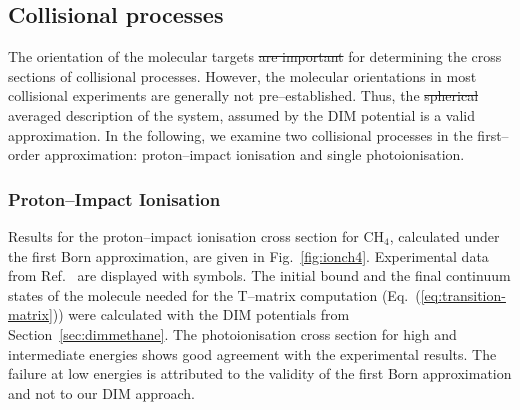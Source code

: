 \documentclass[10pt]{article}
\providecommand{\DIFaddtex}[1]{{\protect\color{blue}\uwave{#1}}} %
\providecommand{\DIFdeltex}[1]{{\protect\color{red}\sout{#1}}}                      %
\providecommand{\DIFaddbegin}{} %
\providecommand{\DIFaddend}{} %
\providecommand{\DIFdelbegin}{} %
\providecommand{\DIFdelend}{} %
\providecommand{\DIFadd}[1]{\texorpdfstring{\DIFaddtex{#1}}{#1}} %
\providecommand{\DIFdel}[1]{\texorpdfstring{\DIFdeltex{#1}}{}} %
\begin{document}
\subsection{Collisional processes}

The orientation of the molecular targets \DIFdelbegin \DIFdel{are important }\DIFdelend \DIFaddbegin \DIFadd{is crucial }\DIFaddend for determining
the cross sections of collisional processes. However, the molecular 
orientations in most collisional experiments are generally not 
pre--established. Thus, the \DIFdelbegin \DIFdel{spherical }\DIFdelend \DIFaddbegin \DIFadd{spherically }\DIFaddend averaged description of the system, 
assumed by the DIM potential is a valid approximation. In the 
following, we examine two collisional processes in the first--order 
approximation: proton--impact ionisation 
and single photoionisation. 

\subsubsection{Proton--Impact Ionisation}

Results for the proton--impact ionisation cross section for CH$_4$,
calculated under the first Born approximation, are given in 
Fig.~\ref{fig:ionch4}. 
Experimental data from Ref.~\cite{Rudd1983,Rudd1985} are displayed 
with symbols. The initial bound and the final continuum states 
of the molecule needed for the T--matrix computation 
(Eq.~(\ref{eq:transition-matrix})) were calculated 
with the DIM potentials from Section~\ref{sec:dimmethane}. 
The photoionisation cross section for high and intermediate energies
shows good agreement with the experimental results. The failure at
low energies is attributed to the validity of the first Born 
approximation and not to our DIM approach.
\end{document}
